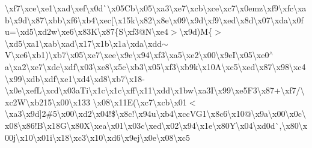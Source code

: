 \begin{DoxyCompactItemize}
\textbackslash{}xf7\textbackslash{}xce\textbackslash{}xe1\textbackslash{}xad\textbackslash{}xef\textbackslash{}x0d\`{}\textbackslash{}x05\+Cb\textbackslash{}x05\textbackslash{}xa3\textbackslash{}xe7\textbackslash{}xcb\textbackslash{}xce\textbackslash{}xc7\textbackslash{}x0emz\textbackslash{}xf9\textbackslash{}xfc\textbackslash{}xab\textbackslash{}x9d\textbackslash{}x87\textbackslash{}xbb\textbackslash{}xf6\textbackslash{}xb4\textbackslash{}xec\mbox{[}\textbackslash{}x15k\textbackslash{}x82\textbackslash{}x8e\textbackslash{}x09\textbackslash{}x9d\textbackslash{}xf9\textbackslash{}xed\textbackslash{}x8d\textbackslash{}x07\textbackslash{}xda\textbackslash{}x0fu=\textbackslash{}xd5\textbackslash{}xd2w\textbackslash{}xe6\textbackslash{}x83\+K\textbackslash{}x87\{\+S\textbackslash{}xf3@\+N\textbackslash{}xe4$>$\textbackslash{}x9d)\+M\{$>$\textbackslash{}xd5\textbackslash{}xa1\textbackslash{}xab\textbackslash{}xad\textbackslash{}x17\textbackslash{}x1b\textbackslash{}x1a\textbackslash{}xda\textbackslash{}xdd$\sim$\+V\textbackslash{}xe6\textbackslash{}xb1)\textbackslash{}xb7\textbackslash{}x05\textbackslash{}xe7\textbackslash{}xee\textbackslash{}x9e\textbackslash{}x94\textbackslash{}xf3\textbackslash{}xa5\textbackslash{}xe2\textquotesingle{}\textbackslash{}x00\textbackslash{}x9e\+I\textbackslash{}x05\textbackslash{}xe0$^\wedge$a\textbackslash{}xa2\textbackslash{}xe7\textbackslash{}xdc\textbackslash{}xdf\textbackslash{}x03\textbackslash{}xe8\textbackslash{}x5c\textbackslash{}xb3\textbackslash{}x05\textbackslash{}xf3\textbackslash{}xb9k\textbackslash{}x10\+A\textbackslash{}xc5\textbackslash{}xed\textbackslash{}x87\textbackslash{}x98\textbackslash{}xc4\textbackslash{}x99\textbackslash{}xdb\textbackslash{}xdf\textbackslash{}xe1\textbackslash{}xd4\textbackslash{}xd8\textbackslash{}xb7\textbackslash{}x18-\/\textbackslash{}x0e\textbackslash{}xef\+L\textbackslash{}xcd\textbackslash{}x03a\+Ti\textbackslash{}x1c\textbackslash{}x1c\textbackslash{}xff\textbackslash{}x11\textbackslash{}xdd\textbackslash{}x1bw\textbackslash{}xa3\+I\textbackslash{}x99\textbackslash{}xe5\+F3\textbackslash{}x87+\textbackslash{}xf7/\textbackslash{}xc2\+W\textbackslash{}xb215\textbackslash{}x00\textbackslash{}x133 \textbackslash{}x08\textbackslash{}x11\+E(\textbackslash{}xc7\textbackslash{}xcb\textbackslash{}x01$<$\textbackslash{}xa3\textbackslash{}x9d\mbox{]}2\#5\textbackslash{}x00\textbackslash{}xd2\textbackslash{}x04!\$\textbackslash{}x8c!\textbackslash{}x94u\textbackslash{}xb4\textbackslash{}xcc\+V\+G1\textbackslash{}x8c6\textbackslash{}x10@\textbackslash{}x9a\textbackslash{}x00\textbackslash{}x0c\textbackslash{}x08\textbackslash{}x86!\+B\textbackslash{}x18\+G\textbackslash{}x80\+X\textbackslash{}xea\textbackslash{}x01\textbackslash{}x03c\textbackslash{}xed\textbackslash{}x02\textbackslash{}x94\textbackslash{}x1e\textbackslash{}x80\+Y\textbackslash{}x04\textbackslash{}xd0d\`{},\textbackslash{}x80\textbackslash{}x00j\textbackslash{}x10\textbackslash{}x01i\textbackslash{}x18\textbackslash{}xc3\textbackslash{}x10\textbackslash{}xd6\textbackslash{}x9ej\textbackslash{}x0e\textbackslash{}x08\textbackslash{}xc5 
\end{DoxyCompactItemize}
